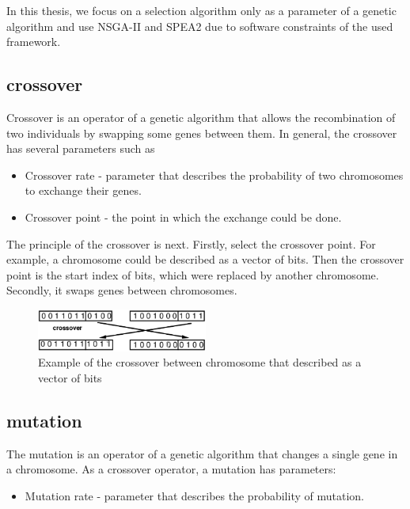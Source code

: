 In this thesis, we focus on a selection algorithm only as a parameter of a genetic algorithm and use NSGA-II and SPEA2 due to software constraints of the used framework. 

\subsection{crossover}\label{sec:GeneticAlgorithmCrossover}

Crossover is an operator of a genetic algorithm that allows the recombination of two individuals by swapping some genes between them.
In general, the crossover has several parameters such as

\begin{itemize}
	\item Crossover rate - parameter that describes the probability of two chromosomes to exchange their genes.
	\item Crossover point - the point in which the exchange could be done.
\end{itemize}

The principle of the crossover is next.
Firstly, select the crossover point. For example, a chromosome could be described as a vector of bits. Then the crossover point is the start index of bits, which were replaced by another chromosome.
Secondly, it swaps genes between chromosomes.

\begin{figure}
	\centering
	\includegraphics[width=0.5\textwidth]{images/crossoverVector.png}
	\caption[Example of the crossover]{Example of the crossover between chromosome that described as a vector of bits}
	\label{fig:crossoverVector}
\end{figure}

\subsection{mutation}\label{sec:GeneticAlgorithmMutation}

The mutation is an operator of a genetic algorithm that changes a single gene in a chromosome. As a crossover operator, a mutation has parameters:

\begin{itemize}
	\item Mutation rate - parameter that describes the probability of mutation.
\end{itemize}

